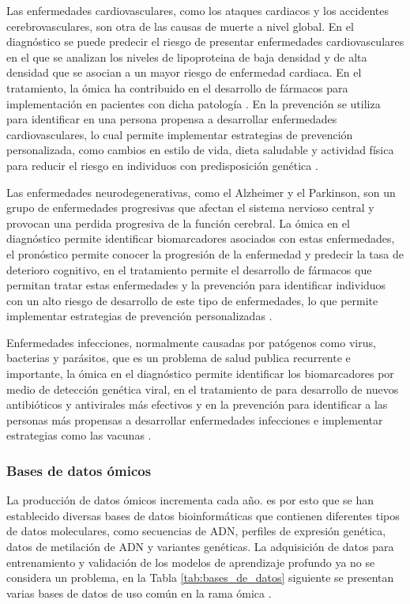 Las enfermedades cardiovasculares, como los ataques cardiacos y los accidentes cerebrovasculares, son otra de las causas de muerte a nivel global. En el diagnóstico se puede predecir el riesgo de presentar enfermedades cardiovasculares en el que se analizan los niveles de lipoproteina de baja densidad y de alta densidad que se asocian a un mayor riesgo de enfermedad cardiaca. En el tratamiento, la ómica ha contribuido en el desarrollo de fármacos para implementación en pacientes con dicha patología \citep{pasha2020cardiovascular}. En la prevención se utiliza para identificar en una persona propensa a desarrollar enfermedades cardiovasculares, lo cual permite implementar estrategias de prevención personalizada, como cambios en estilo de vida, dieta saludable y actividad física para reducir el riesgo en individuos con predisposición genética \citep{wang2017detecting}.

Las enfermedades neurodegenerativas, como el Alzheimer y el Parkinson, son un grupo de enfermedades progresivas que afectan el sistema nervioso central y provocan una perdida progresiva de la función cerebral. La ómica en el diagnóstico permite identificar biomarcadores asociados con estas enfermedades, el pronóstico permite conocer la progresión de la enfermedad y predecir la tasa de deterioro cognitivo, en el tratamiento permite el desarrollo de fármacos que permitan tratar estas enfermedades y la prevención para identificar individuos con un alto riesgo de desarrollo de este tipo de enfermedades, lo que permite implementar estrategias de prevención personalizadas \citep{erdacs2021neurodegenerative}.

Enfermedades infecciones, normalmente causadas por patógenos como virus, bacterias y parásitos, que es un problema de salud publica recurrente e importante, la ómica en el diagnóstico permite identificar los biomarcadores por medio de detección genética viral, en el tratamiento de para desarrollo de nuevos antibióticos y antivirales más efectivos y en la prevención para identificar a las personas más propensas a desarrollar enfermedades infecciones e implementar estrategias como las vacunas \citep{chae2018predicting}.



\subsubsection{Bases de datos ómicos}

La producción de datos ómicos incrementa cada año. es por esto que se han establecido diversas bases de datos bioinformáticas que contienen diferentes tipos de datos moleculares, como secuencias de ADN, perfiles de expresión genética, datos de metilación de ADN y variantes genéticas. La adquisición de datos para entrenamiento y validación de los modelos de aprendizaje profundo ya no se considera un problema, en la Tabla \ref{tab:bases_de_datos} siguiente se presentan varias bases de datos de uso común en la rama ómica \citep{zhang2019deep}.

